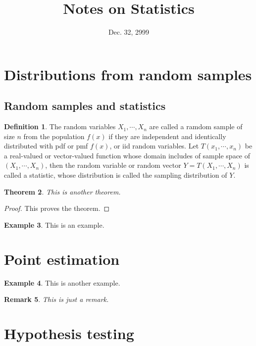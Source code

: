 \documentclass[12pt]{article}
\newtheorem{theorem}{Theorem}[section]
\newtheorem{remark}[theorem]{Remark}
\theoremstyle{definition}
\newtheorem{definition}[theorem]{Definition}
\newtheorem{example}[theorem]{Example}
\begin{document}
\title{Notes on Statistics}
\date{Dec. 32, 2999}

\maketitle

\section{Distributions from random samples}

  \subsection{Random samples and statistics}

    \begin{definition}
      The random variables $X_1,\cdots,X_n$ are called a ramdom sample of 
      size $n$ from the population $f(x)$ if they are independent and identically
      distributed with pdf or pmf $f(x)$, or iid random
      variables. Let $T(x_1,\cdots,x_n)$ be a real-valued or vector-valued
      function whose domain includes of sample space of $(X_1,\cdots,X_n)$,
      then the random variable or random vector $Y=T(X_1,\cdots,X_n)$ is called 
      a statistic, whose distribution is called the sampling distribution of $Y$.
    \end{definition}

    \begin{theorem}
      This is another theorem.
    \end{theorem}
    \begin{proof}
      This proves the theorem.
    \end{proof}

    \begin{example}
      This is an example.
    \end{example}


\section{Point estimation}

  \begin{example}
    This is another example.
  \end{example}

  \begin{remark}
    This is just a remark.
  \end{remark}

\section{Hypothesis testing}
\end{document}
